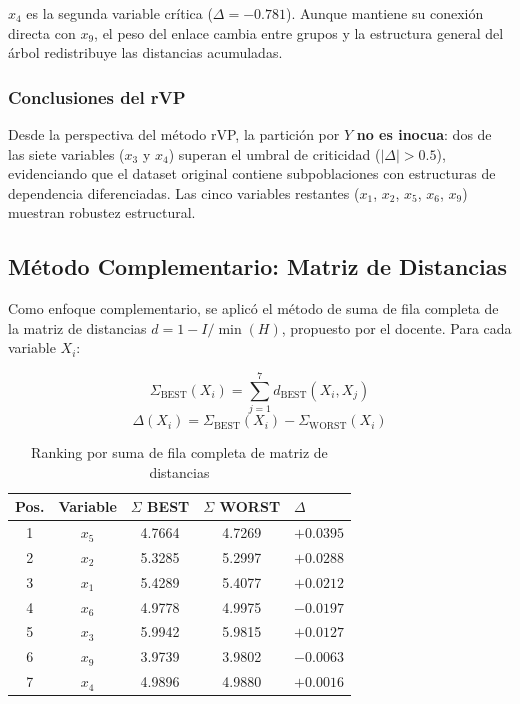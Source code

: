 \documentclass[12pt, a4paper]{article}
\begin{document}
$x_4$ es la segunda variable crítica ($\Delta = -0.781$). Aunque mantiene
su conexión directa con $x_9$, el peso del enlace cambia entre grupos
y la estructura general del árbol redistribuye las distancias acumuladas.

\subsubsection{Conclusiones del rVP}

Desde la perspectiva del método rVP, la partición por $Y$ \textbf{no es
inocua}: dos de las siete variables ($x_3$ y $x_4$) superan el umbral de
criticidad ($|\Delta| > 0.5$), evidenciando que el dataset original contiene
subpoblaciones con estructuras de dependencia diferenciadas. Las cinco
variables restantes ($x_1$, $x_2$, $x_5$, $x_6$, $x_9$) muestran robustez
estructural.

\subsection{Método Complementario: Matriz de Distancias}

Como enfoque complementario, se aplicó el método de suma de fila completa
de la matriz de distancias $d = 1 - I/\min(H)$, propuesto por el docente.
Para cada variable $X_i$:

\begin{equation*}
    \Sigma_{\text{BEST}}(X_i) = \sum_{j=1}^{7} d_{\text{BEST}}(X_i, X_j)
\end{equation*}
\begin{equation*}
    \Delta(X_i) = \Sigma_{\text{BEST}}(X_i) - \Sigma_{\text{WORST}}(X_i)
\end{equation*}

\begin{table}[H]
    \centering
    \caption{Ranking por suma de fila completa de matriz de distancias}
    \small
    \begin{tabular}{cccc}
    \toprule
    Pos. & Variable & $\Sigma$ BEST & $\Sigma$ WORST & $\Delta$ \\
     & $x_5$  & 4.7664 & 4.7269 & $+0.0395$ \\
    2 & $x_2$  & 5.3285 & 5.2997 & $+0.0288$ \\
    3 & $x_1$  & 5.4289 & 5.4077 & $+0.0212$ \\
    4 & $x_6$  & 4.9778 & 4.9975 & $-0.0197$ \\
    5 & $x_3$  & 5.9942 & 5.9815 & $+0.0127$ \\
    6 & $x_9$  & 3.9739 & 3.9802 & $-0.0063$ \\
    7 & $x_4$  & 4.9896 & 4.9880 & $+0.0016$ \\
    \bottomrule
    \end{tabular}
\end{table}
\end{document}
